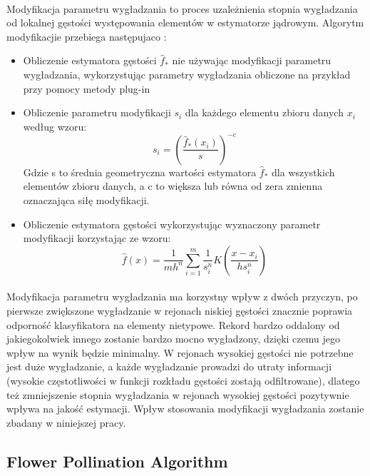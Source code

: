 \documentclass[a4paper,12pt,twoside]{article}
\begin{document}
\paragraph{}
Modyfikacja parametru wygładzania to proces uzależnienia stopnia wygładzania od lokalnej gęstości występowania elementów w estymatorze jądrowym. Algorytm modyfikacjie przebiega następujaco \cite{kde}:
\begin{itemize}
\item Obliczenie estymatora gęstości $\hat{f}_{*}$ nie używając modyfikacji parametru wygładzania, wykorzystując parametry wygładzania obliczone na przykład przy pomocy metody plug-in
\item Obliczenie parametru modyfikacji $s_{i}$ dla każdego elementu zbioru danych $x_{i}$ według wzoru:
\begin{equation} s_{i}=\left(\frac{\hat{f}_{*}(x_{i})}{s}\right)^{-c} 
\end{equation}
Gdzie s to średnia geometryczna wartości estymatora $\hat{f}_{*}$  dla wszystkich elementów zbioru danych, a c to większa lub równa od zera zmienna oznaczająca siłę modyfikacji.
\item Obliczenie estymatora gęstości wykorzystując wyznaczony parametr modyfikacji korzystając ze wzoru:
\begin{equation}
\hat{f}(x)=\frac{1}{mh^n}\sum_{i=1}^{m}\frac{1}{s^{n}_{i}}K\left ( \frac{x-x_{i}}{hs^{n}_{i}} \right )
\end{equation}
\end{itemize}
 \paragraph{}
Modyfikacja parametru wygładzania ma korzystny wpływ z dwóch przyczyn, po pierwsze zwiększone wygładzanie w rejonach niskiej gęstości znacznie poprawia odporność klasyfikatora na elementy nietypowe. Rekord bardzo oddalony od jakiegokolwiek innego zostanie bardzo mocno wygładzony, dzięki czemu jego wpływ na wynik będzie minimalny.  W rejonach wysokiej gęstości nie potrzebne jest duże wygładzanie, a każde wygładzanie prowadzi do utraty informacji (wysokie częstotliwości w funkcji rozkładu gęstości zostają odfiltrowane), dlatego też zmniejszenie stopnia wygładzania w rejonach wysokiej gęstości pozytywnie wpływa na jakość estymacji. 
 Wpływ stosowania modyfikacji wygładzania zostanie zbadany w niniejszej pracy.
\subsection{Flower Pollination Algorithm}
\end{document}
